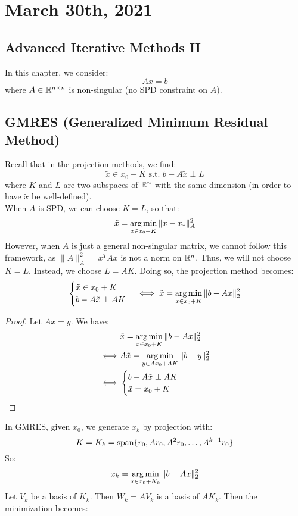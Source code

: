 \documentclass[../main/main.tex]{subfiles}
\begin{document}
\section{March 30th, 2021}
\subsection{Advanced Iterative Methods II}
In this chapter, we consider: \[
  Ax = b
\] where $A\in \mathbb{R} ^{n\times  n}$ is non-singular (no SPD constraint on $A$).
\subsection{GMRES (Generalized Minimum Residual Method)}
Recall that in the projection methods, we find: \[
\tilde{x} \in x_{0} +K \text{ s.t. } b-A\tilde{x}\perp L
\] where $K$ and $L$ are two subspaces of $\mathbb{R} ^{n}$ with the same dimension (in order to have $\tilde{x}$ be well-defined). \\

When $A$ is SPD, we can choose $K=L$, so that: \[
\tilde{x} = \operatorname*{arg\,min}_{x\in x_{0}+K}\|x-x_{*}\|_{A}^2
\]
However, when $A$ is just a general non-singular matrix, we cannot follow this framework, as $\|A \|_{A}^2=x^{T}Ax$ is not a norm on $\mathbb{R} ^{n}$. Thus, we will not choose $K=L$. Instead, we choose $L=AK$. Doing so, the projection method becomes: \[
  \begin{cases}
    \tilde{x}\in  x_{0}+K \\
    b-A\tilde{x} \perp AK
  \end{cases} \iff  \tilde{x} = \operatorname*{arg\,min}_{x\in x_{0}+K}\|b-Ax\|_{2}^2
\]
\begin{proof}
  Let $Ax=y$. We have: \begin{align*}
           &\tilde{x} = \operatorname*{arg\,min}_{x\in x_{0}+K}\|b-Ax\|_{2}^2\\
           \iff& A\tilde{x} = \operatorname*{arg\,min}_{y\in Ax_{0}+AK}\|b-y\|_{2}^2\\
                         \iff &\begin{cases}
                           b-A\tilde{x}\perp AK\\
                           \tilde{x}=x_{0}+K
                         \end{cases}
           \end{align*}
\end{proof}
In GMRES, given $x_{0}$, we generate $x_{k}$ by projection with: \[
K = K_{k} = \operatorname{span} \{r_{0}, Ar_{0}, A^2r_{0}, \ldots , A^{k-1}r_{0} \}
\]
So: \[
x_{k}=\operatorname*{arg\,min}_{x\in x_{0}+K_{k}} \|b-Ax\|_{2}^2
\]
Let $V_{k}$ be a basis of $K_{k}$. Then $W_{k} = AV_{k}$ is a basis of $AK_{k}$. Then the minimization becomes:
\end{document}
